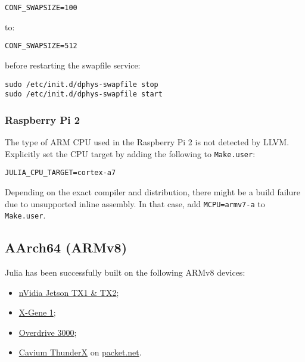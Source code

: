 \begin{lstlisting}
CONF_SWAPSIZE=100
\end{lstlisting}



to:




\begin{lstlisting}
CONF_SWAPSIZE=512
\end{lstlisting}



before restarting the swapfile service:




\begin{lstlisting}
sudo /etc/init.d/dphys-swapfile stop
sudo /etc/init.d/dphys-swapfile start
\end{lstlisting}



\hypertarget{17980381388168105915}{}


\subsubsection{Raspberry Pi 2}



The type of ARM CPU used in the Raspberry Pi 2 is not detected by LLVM. Explicitly set the CPU target by adding the following to \texttt{Make.user}:



\texttt{JULIA\_CPU\_TARGET=cortex-a7}



Depending on the exact compiler and distribution, there might be a build failure due to unsupported inline assembly. In that case, add \texttt{MCPU=armv7-a} to \texttt{Make.user}.



\hypertarget{17302249718319781638}{}


\subsection{AArch64 (ARMv8)}



Julia has been successfully built on the following ARMv8 devices:



\begin{itemize}
\item \href{https://www.nvidia.com/object/embedded-systems-dev-kits-modules.html}{nVidia Jetson TX1 \& TX2};


\item \href{https://www.apm.com/products/data-center/x-gene-family/x-gene/}{X-Gene 1};


\item \href{https://softiron.com/products/overdrive-3000/}{Overdrive 3000};


\item \href{https://www.cavium.com/ThunderX\_ARM\_Processors.html}{Cavium ThunderX} on \href{https://www.packet.net}{packet.net}.

\end{itemize}


